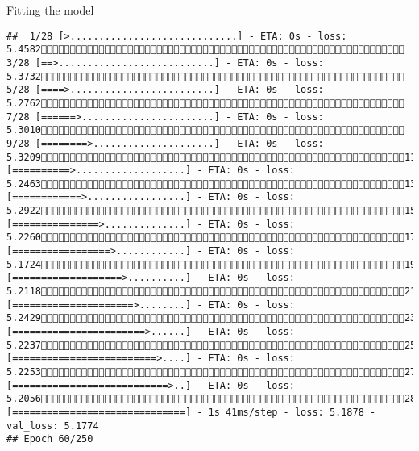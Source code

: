 \documentclass[
  ignorenonframetext,
]{beamer}
\begin{document}
\begin{frame}[fragile]{Fitting the model}
\begin{verbatim}
##  1/28 [>.............................] - ETA: 0s - loss: 5.4582 3/28 [==>...........................] - ETA: 0s - loss: 5.3732 5/28 [====>.........................] - ETA: 0s - loss: 5.2762 7/28 [======>.......................] - ETA: 0s - loss: 5.3010 9/28 [========>.....................] - ETA: 0s - loss: 5.320911/28 [==========>...................] - ETA: 0s - loss: 5.246313/28 [============>.................] - ETA: 0s - loss: 5.292215/28 [===============>..............] - ETA: 0s - loss: 5.226017/28 [=================>............] - ETA: 0s - loss: 5.172419/28 [===================>..........] - ETA: 0s - loss: 5.211821/28 [=====================>........] - ETA: 0s - loss: 5.242923/28 [=======================>......] - ETA: 0s - loss: 5.223725/28 [=========================>....] - ETA: 0s - loss: 5.225327/28 [===========================>..] - ETA: 0s - loss: 5.205628/28 [==============================] - 1s 41ms/step - loss: 5.1878 - val_loss: 5.1774
## Epoch 60/250

\end{verbatim}
\end{frame}
\end{document}
